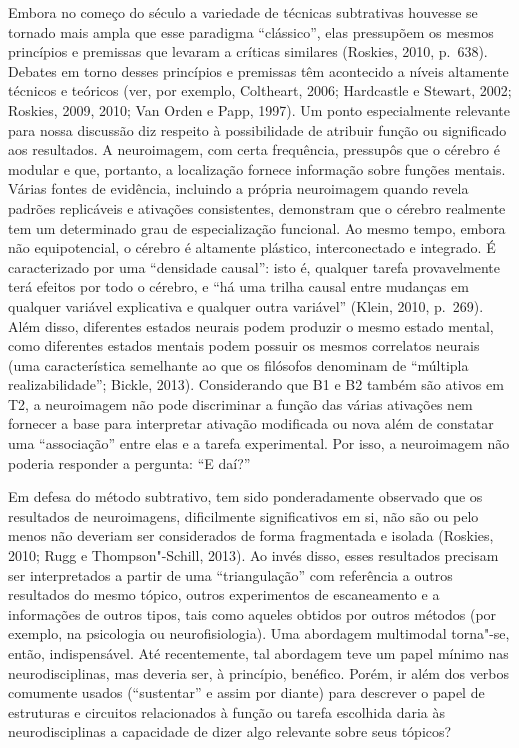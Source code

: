 Embora no começo do século  a variedade de técnicas subtrativas
houvesse se tornado mais ampla que esse paradigma ``clássico'', elas
pressupõem os mesmos princípios e premissas que levaram a críticas
similares (Roskies, 2010, p.~638). Debates em torno desses princípios e
premissas têm acontecido a níveis altamente técnicos e teóricos (ver,
por exemplo, Coltheart, 2006; Hardcastle e Stewart, 2002; Roskies, 2009,
2010; Van Orden e Papp, 1997). Um ponto especialmente relevante para
nossa discussão diz respeito à possibilidade de atribuir função ou
significado aos resultados. A neuroimagem, com certa frequência,
pressupôs que o cérebro é modular e que, portanto, a localização fornece
informação sobre funções mentais. Várias fontes de evidência, incluindo
a própria neuroimagem quando revela padrões replicáveis e ativações
consistentes, demonstram que o cérebro realmente tem um determinado grau
de especialização funcional. Ao mesmo tempo, embora não equipotencial, o
cérebro é altamente plástico, interconectado e integrado. É
caracterizado por uma ``densidade causal'': isto é, qualquer tarefa
provavelmente terá efeitos por todo o cérebro, e ``há uma trilha causal
entre mudanças em qualquer variável explicativa e qualquer outra
variável'' (Klein, 2010, p.~269). Além disso, diferentes estados neurais
podem produzir o mesmo estado mental, como diferentes estados mentais
podem possuir os mesmos correlatos neurais (uma característica semelhante ao
que os filósofos denominam de ``múltipla realizabilidade''; Bickle,
2013). Considerando que B1 e B2 também são ativos em T2, a neuroimagem
não pode discriminar a função das várias ativações nem fornecer a base
para interpretar ativação modificada ou nova além de constatar uma
``associação'' entre elas e a tarefa experimental. Por isso, a
neuroimagem não poderia responder a pergunta: ``E daí?''

Em defesa do método subtrativo, tem sido ponderadamente observado que os
resultados de neuroimagens, dificilmente significativos em si, não são
ou pelo menos não deveriam ser considerados de forma fragmentada e
isolada (Roskies, 2010; Rugg e Thompson"-Schill, 2013). Ao invés disso,
esses resultados precisam ser interpretados a partir de uma
``triangulação'' com referência a outros resultados do mesmo tópico,
outros experimentos de escaneamento e a informações de outros tipos,
tais como aqueles obtidos por outros métodos (por exemplo, na psicologia
ou neurofisiologia). Uma abordagem multimodal torna"-se, então,
indispensável. Até recentemente, tal abordagem teve um papel mínimo nas
neurodisciplinas, mas deveria ser, à princípio, benéfico. Porém, ir além
dos verbos comumente usados (``sustentar'' e assim por diante) para
descrever o papel de estruturas e circuitos relacionados à função ou
tarefa escolhida daria às neurodisciplinas a capacidade de dizer algo
relevante sobre seus tópicos?

